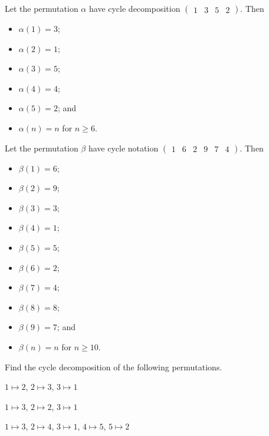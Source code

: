 \newpage

\begin{example}
    Let the permutation $\alpha$ have cycle decomposition $\begin{pmatrix}1 & 3 & 5 & 2\end{pmatrix}$. Then
    \begin{multicols}{3}
        \begin{itemize}
            \item $\alpha(1) = 3$;
            \item $\alpha(2) = 1$;
            \item $\alpha(3) = 5$;
            \item $\alpha(4) = 4$;
            \item $\alpha(5) = 2$; and
            \item $\alpha(n) = n$ for $n \geq 6$.
        \end{itemize}
    \end{multicols}
\end{example}

\begin{example}
    Let the permutation $\beta$ have cycle notation $\begin{pmatrix}1 & 6 & 2 & 9 & 7 & 4\end{pmatrix}$. Then
    \begin{multicols}{3}
        \begin{itemize}
            \item $\beta(1) = 6$;
            \item $\beta(2) = 9$;
            \item $\beta(3) = 3$;
            \item $\beta(4) = 1$;
            \item $\beta(5) = 5$;
            \item $\beta(6) = 2$;
            \item $\beta(7) = 4$;
            \item $\beta(8) = 8$;
            \item $\beta(9) = 7$; and
            \item $\beta(n) = n$ for $n \geq 10$.
        \end{itemize}
    \end{multicols}
\end{example}

\begin{exercise}
    Find the cycle decomposition of the following permutations.
    \begin{partquestions}{\alph*}
        \item $1 \mapsto 2$, $2 \mapsto 3$, $3 \mapsto 1$
        \item $1 \mapsto 3$, $2 \mapsto 2$, $3 \mapsto 1$
        \item $1 \mapsto 3$, $2 \mapsto 4$, $3 \mapsto 1$, $4 \mapsto 5$, $5 \mapsto 2$
    \end{partquestions}
\end{exercise}

